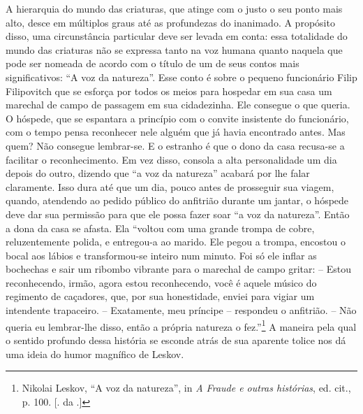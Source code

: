 A hierarquia do mundo das criaturas, que atinge com o justo o seu ponto
mais alto, desce em múltiplos graus até as profundezas do inanimado. A
propósito disso, uma circunstância particular deve ser levada em conta:
essa totalidade do mundo das criaturas não se expressa tanto na voz
humana quanto naquela que pode ser nomeada de acordo com o título de um
de seus contos mais significativos: ``A voz da natureza''. Esse conto é
sobre o pequeno funcionário Filip Filipovitch que se esforça por todos
os meios para hospedar em sua casa um marechal de campo de passagem em
sua cidadezinha. Ele consegue o que queria. O hóspede, que se espantara
a princípio com o convite insistente do funcionário, com o tempo pensa
reconhecer nele alguém que já havia encontrado antes. Mas quem? Não
consegue lembrar-se. E o estranho é que o dono da casa recusa-se a
facilitar o reconhecimento. Em vez disso, consola a alta personalidade
um dia depois do outro, dizendo que ``a voz da natureza'' acabará por
lhe falar claramente. Isso dura até que um dia, pouco antes de
prosseguir sua viagem, quando, atendendo ao pedido público do anfitrião
durante um jantar, o hóspede deve dar sua permissão para que ele possa
fazer soar ``a voz da natureza''. Então a dona da casa se afasta. Ela
``voltou com uma grande trompa de cobre, reluzentemente polida, e
entregou-a ao marido. Ele pegou a trompa, encostou o bocal aos lábios e
transformou-se inteiro num minuto. Foi só ele inflar as bochechas e sair
um ribombo vibrante para o marechal de campo gritar: -- Estou
reconhecendo, irmão, agora estou reconhecendo, você é aquele músico do
regimento de caçadores, que, por sua honestidade, enviei para vigiar um
intendente trapaceiro. -- Exatamente, meu príncipe -- respondeu o
anfitrião. -- Não queria eu lembrar-lhe disso, então a própria natureza
o fez.''\footnote{Nikolai Leskov, ``A voz da natureza'', in \emph{A
  Fraude e outras histórias}, ed. cit., p. 100. [. da .]} A
maneira pela qual o sentido profundo dessa história se esconde atrás de
sua aparente tolice nos dá uma ideia do humor magnífico de Leskov.

